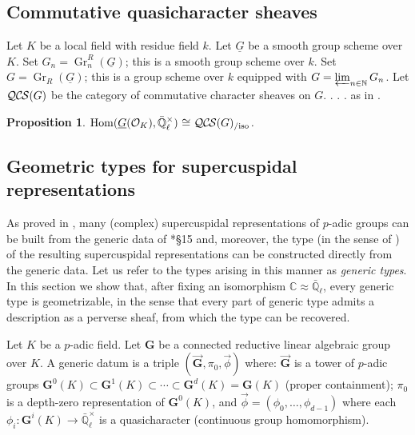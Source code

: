 \documentclass[10pt]{amsart}
\theoremstyle{plain}
\newtheorem{proposition}[theorem]{Proposition}
\theoremstyle{definition}
\newcommand{\NN}{{\mathbb{N}}}
\newcommand{\CC}{{\mathbb{C}}}
\newcommand{\EE}{\mathbb{\bar Q}_\ell}
\newcommand{\OK}{\mathcal{O}_K}
\newcommand{\Fq}{k}
\newcommand{\EEx}{\EE^\times}
\newcommand{\G}{\textbf{G}}
\DeclareMathOperator{\Hom}{Hom}
\DeclareMathOperator{\Gr}{Gr}
\newcommand{\iso}{{\ \cong\ }}
\newcommand{\QCS}{{\mathcal{QC\hskip-0.8pt S}}}
\newcommand{\QCSiso}[1]{\QCS(#1)_{/\text{iso}}}
\begin{document}
\subsection{Commutative quasicharacter sheaves}

Let $K$ be a local field with residue field $\Fq$.
Let $\underline{G}$ be a smooth group scheme over $K$.
Set $G_n = \Gr^R_n(\underline{G})$; this is a smooth group scheme over $\Fq$.
Set $G = \Gr_R(\underline{G})$; this is a group scheme over $\Fq$ equipped with $G = \varprojlim_{n\in \NN} G_n$.
Let $\QCS(G)$ be the category of commutative character sheaves on $G$. . . .  as in \cite{cunningham-roe:13a}.

\begin{proposition}\label{prop:QCS}
$\Hom(\underline{G}(\OK),\EEx) \iso \QCSiso{G}$.
\end{proposition}

 \subsection{Geometric types for supercuspidal representations}


As proved in \cite{kim:07a}, many (complex) supercuspidal representations of $p$-adic groups can be built from the generic data of \cite{yu:01a}*{\S 15} and, moreover, the type (in the sense of \cite{bushnell-kutzko:98a}) of the resulting supercuspidal representations can be constructed directly from the generic data. 
Let us refer to the types arising in this manner as {\it generic types}.
In this section we show that, after fixing an isomorphism $\CC \approx \EE$, every generic type is geometrizable, in the sense that every part of generic type admits a description as a perverse sheaf, from which the type can be recovered.

Let $K$ be a $p$-adic field. Let $\G$ be a connected reductive linear algebraic group over $K$. 
A generic datum is a triple $(\vec{\G}, \pi_0, \vec{\phi})$ where: $\vec{\G}$ is a tower of $p$-adic groups $\G^0(K) \subset \G^1(K) \subset \cdots  \subset \G^d(K) = \G(K)$ (proper containment); $\pi_0$ is a depth-zero representation of $\G^0(K)$, and $\vec{\phi} = (\phi_0, \ldots , \phi_{d-1})$ where each $\phi_i : \G^i(K) \to \EEx$ is a quasicharacter (continuous group homomorphism).  

\end{document}
